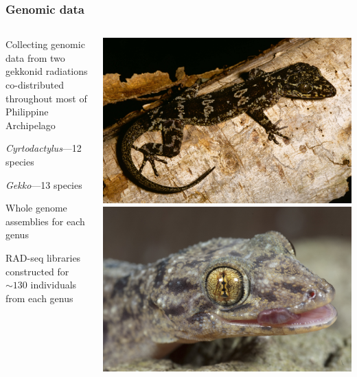 \begin{frame}
    \frametitle{Genomic data}
    \begin{columns}[c]
        \begin{myitemize}
            \item Collecting genomic data from two gekkonid radiations
                co-distributed throughout most of Philippine Archipelago
            \begin{myitemize}
                \item \emph{Cyrtodactylus}---12 species
                \item \emph{Gekko}---13 species
            \end{myitemize}
            \item Whole genome assemblies for each genus
            \item RAD-seq libraries constructed for $\sim130$ individuals
                from each genus
        \end{myitemize}
        \includegraphics[width=\textwidth]{images/photos/cyrt-agusanensis.jpg} \quad
        \includegraphics[width=\textwidth]{images/photos/gekko-mindorensis.jpg}
    \end{columns}
\end{frame}


